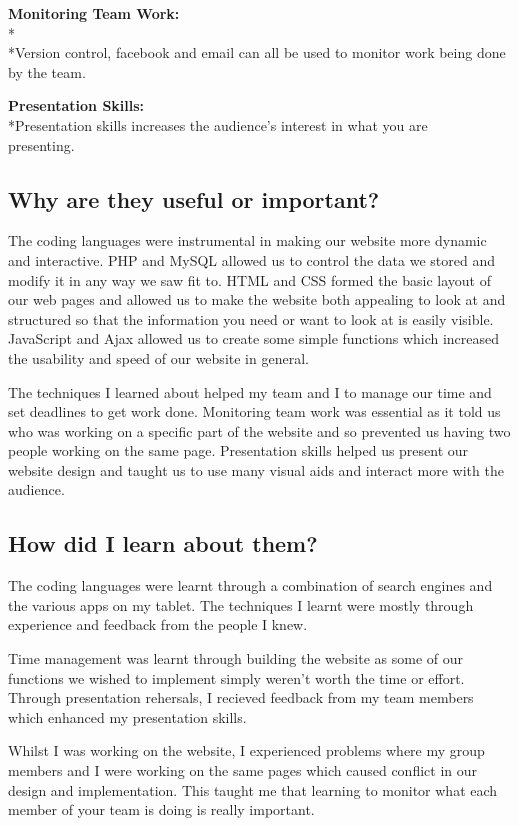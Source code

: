 \documentclass[12pt,a4paper]{article}
\begin{document}
\textbf{Monitoring Team Work:}
		\\*\\*Version control, facebook and email can all be used to monitor work
		being done by the team. 
		
\textbf{Presentation Skills:}
		\\*Presentation skills increases the audience's interest in what you are \\presenting. 

\newpage   
\subsection{Why are they useful or important?}

The coding languages were instrumental in making our website more dynamic and interactive.
PHP and MySQL allowed us to control the data we stored and modify it in any way we saw fit to. 
HTML and CSS formed the basic layout of our web pages and allowed us to make the website
both appealing to look at and structured so that the information you need or want to look 
at is easily visible. JavaScript and Ajax allowed us to create some simple functions which
increased the usability and speed of our website in general.

The techniques I learned about helped my team and I to manage our time and set deadlines 
to get work done. Monitoring team work was essential as it told us who was working on a specific
part of the website and so prevented us having two people working on the same page.
Presentation skills helped us present our website design and taught us to use many
visual aids and interact more with the audience.

\subsection{How did I learn about them?}

The coding languages were learnt through a combination of search engines and the
various apps on my tablet.
The techniques I learnt were mostly through experience and feedback from the people I knew.

Time management was learnt through building the website as some of our functions we wished
to implement simply weren't worth the time or effort. Through presentation rehersals,
I recieved feedback from my team members which enhanced my presentation skills.

Whilst I was working on the website, I experienced problems where my group members and I were
working on the same pages which caused conflict in our design and implementation. This taught me
that learning to monitor what each member of your team is doing is really important.
\end{document}

